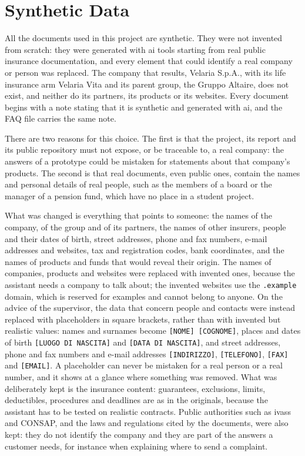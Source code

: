 \section{Synthetic Data}
\label{sec:synthetic-data}

All the documents used in this project are synthetic. They were not invented from scratch: they
were generated with \ac{ai} tools starting from real public insurance documentation, and every
element that could identify a real company or person was replaced. The company that results,
Velaria S.p.A., with its life insurance arm Velaria Vita and its parent group, the Gruppo Altaire,
does not exist, and neither do its partners, its products or its websites. Every document begins
with a note stating that it is synthetic and generated with \ac{ai}, and the FAQ file carries the
same note.

There are two reasons for this choice. The first is that the project, its report and its public
repository must not expose, or be traceable to, a real company: the answers of a prototype could
be mistaken for statements about that company's products. The second is that real documents, even
public ones, contain the names and personal details of real people, such as the members of a board
or the manager of a pension fund, which have no place in a student project.

What was changed is everything that points to someone: the names of the company, of the group and
of its partners, the names of other insurers, people and their dates of birth, street addresses,
phone and fax numbers, e-mail addresses and websites, tax and registration codes, bank
coordinates, and the names of products and funds that would reveal their origin. The names of
companies, products and websites were replaced with invented ones, because the assistant needs a
company to talk about; the invented websites use the \texttt{.example} domain, which is reserved for
examples and cannot belong to anyone. On the advice of the supervisor, the data that concern people
and contacts were instead replaced with placeholders in square brackets, rather than with invented
but realistic values: names and surnames become \texttt{[NOME] [COGNOME]}, places and dates of birth
\texttt{[LUOGO DI NASCITA]} and \texttt{[DATA DI NASCITA]}, and street addresses, phone and fax numbers
and e-mail addresses \texttt{[INDIRIZZO]}, \texttt{[TELEFONO]}, \texttt{[FAX]} and \texttt{[EMAIL]}.
A placeholder can never be mistaken for a real person or a real number, and it shows at a glance
where something was removed.
What was deliberately kept is the insurance content: guarantees, exclusions, limits, deductibles,
procedures and deadlines are as in the originals, because the assistant has to be tested on
realistic contracts. Public authorities such as \ac{ivass} and CONSAP, and the laws and regulations
cited by the documents, were also kept: they do not identify the company and they are part of the
answers a customer needs, for instance when explaining where to send a complaint.

